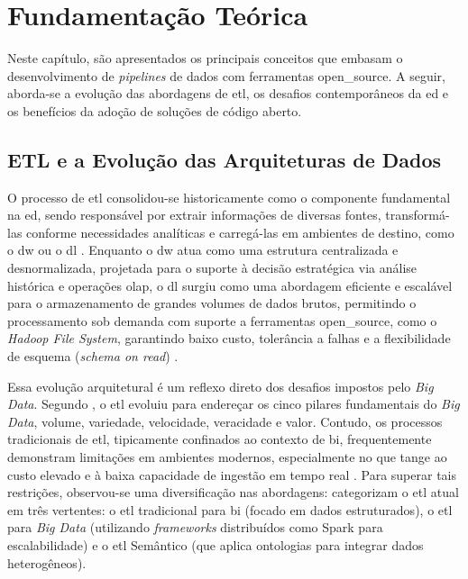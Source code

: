 \chapter{Fundamentação Teórica}
\label{sec:fundamentacao}

Neste capítulo, são apresentados os principais conceitos que embasam o desenvolvimento de \textit{pipelines} de dados com ferramentas \acs{open_source}. A seguir, aborda-se a evolução das abordagens de \ac{etl}, os desafios contemporâneos da \ac{ed} e os benefícios da adoção de soluções de código aberto.

\section{ETL e a Evolução das Arquiteturas de Dados}
\label{sec:etl_evolucao}

O processo de \acs{etl} consolidou-se historicamente como o componente fundamental na \acs{ed}, sendo responsável por extrair informações de diversas fontes, transformá-las conforme necessidades analíticas e carregá-las em ambientes de destino, como o \acs{dw} ou o \acs{dl} \cite{septian2019, nwokeji2021}. Enquanto o \acs{dw} atua como uma estrutura centralizada e desnormalizada, projetada para o suporte à decisão estratégica via análise histórica e operações \ac{olap}, o \acs{dl} surgiu como uma abordagem eficiente e escalável para o armazenamento de grandes volumes de dados brutos, permitindo o processamento sob demanda com suporte a ferramentas \acs{open_source}, como o \textit{Hadoop File System}, garantindo baixo custo, tolerância a falhas e a flexibilidade de esquema (\textit{schema on read}) \cite{septian2019}.

Essa evolução arquitetural é um reflexo direto dos desafios impostos pelo \textit{Big Data}. Segundo \cite{nwokeji2021}, o \acs{etl} evoluiu para endereçar os cinco pilares fundamentais do \textit{Big Data}, volume, variedade, velocidade, veracidade e valor. Contudo, os processos tradicionais de \acs{etl}, tipicamente confinados ao contexto de \ac{bi}, frequentemente demonstram limitações em ambientes modernos, especialmente no que tange ao custo elevado e à baixa capacidade de ingestão em tempo real \cite{nwokeji2021}. Para superar tais restrições, observou-se uma diversificação nas abordagens: \cite{boulahia2024} categorizam o \acs{etl} atual em três vertentes: o \acs{etl} tradicional para \ac{bi} (focado em dados estruturados), o \acs{etl} para \textit{Big Data} (utilizando \textit{frameworks} distribuídos como Spark para escalabilidade) e o \acs{etl} Semântico (que aplica ontologias para integrar dados heterogêneos).

